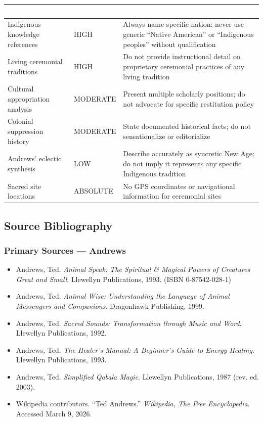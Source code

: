 \documentclass[11pt,letterpaper]{article}
\newcommand{\tableheader}[1]{\textbf{\sffamily\textcolor{white}{#1}}}
\begin{document}
\begin{center}
\begin{tabularx}{\textwidth}{L{4cm}L{2.5cm}X}
\toprule
{}
\tableheader{Area} & \tableheader{Level} & \tableheader{Protocol} \\
\midrule
Indigenous knowledge references & HIGH & Always name specific nation; never use generic ``Native American'' or ``Indigenous peoples'' without qualification \\
Living ceremonial traditions & HIGH & Do not provide instructional detail on proprietary ceremonial practices of any living tradition \\
Cultural appropriation analysis & MODERATE & Present multiple scholarly positions; do not advocate for specific restitution policy \\
Colonial suppression history & MODERATE & State documented historical facts; do not sensationalize or editorialize \\
Andrews' eclectic synthesis & LOW & Describe accurately as syncretic New Age; do not imply it represents any specific Indigenous tradition \\
Sacred site locations & ABSOLUTE & No GPS coordinates or navigational information for ceremonial sites \\
\bottomrule
\end{tabularx}
\end{center}

\subsection{Source Bibliography}

\subsubsection{Primary Sources --- Andrews}

\begin{itemize}[noitemsep]
  \item Andrews, Ted. \emph{Animal Speak: The Spiritual \& Magical Powers of Creatures Great and Small}. Llewellyn Publications, 1993. (ISBN 0-87542-028-1)
  \item Andrews, Ted. \emph{Animal Wise: Understanding the Language of Animal Messengers and Companions}. Dragonhawk Publishing, 1999.
  \item Andrews, Ted. \emph{Sacred Sounds: Transformation through Music and Word}. Llewellyn Publications, 1992.
  \item Andrews, Ted. \emph{The Healer's Manual: A Beginner's Guide to Energy Healing}. Llewellyn Publications, 1993.
  \item Andrews, Ted. \emph{Simplified Qabala Magic}. Llewellyn Publications, 1987 (rev. ed. 2003).
  \item Wikipedia contributors. ``Ted Andrews.'' \emph{Wikipedia, The Free Encyclopedia}. Accessed March 9, 2026.
\end{itemize}
\end{document}
